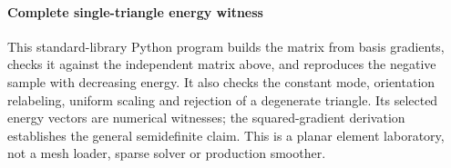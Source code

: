 \paragraph{Complete single-triangle energy witness}\label{03-visual-computing-i-ch002-complete-single-triangle-energy-witness}

This standard-library Python program builds the matrix from basis gradients, checks it against the independent matrix above, and reproduces the negative sample with decreasing energy. It also checks the constant mode, orientation relabeling, uniform scaling and rejection of a degenerate triangle. Its selected energy vectors are numerical witnesses; the squared-gradient derivation establishes the general semidefinite claim. This is a planar element laboratory, not a mesh loader, sparse solver or production smoother.

